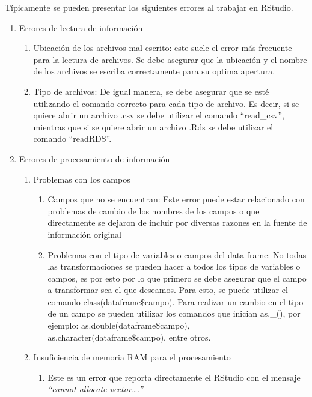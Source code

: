 \documentclass[
]{article}
\begin{document}
Típicamente se pueden presentar los siguientes errores al trabajar en RStudio.

\begin{enumerate}
\def\labelenumi{\arabic{enumi})}
\item
  Errores de lectura de información

  \begin{enumerate}
  \def\labelenumii{\alph{enumii}.}
  \item
    Ubicación de los archivos mal escrito: este suele el error más frecuente para la lectura de archivos. Se debe asegurar que la ubicación y el nombre de los archivos se escriba correctamente para su optima apertura.
  \item
    Tipo de archivos: De igual manera, se debe asegurar que se esté utilizando el comando correcto para cada tipo de archivo. Es decir, si se quiere abrir un archivo .csv se debe utilizar el comando ``read\_csv'', mientras que si se quiere abrir un archivo .Rds se debe utilizar el comando ``readRDS''.
  \end{enumerate}
\item
  Errores de procesamiento de información

  \begin{enumerate}
  \def\labelenumii{\alph{enumii}.}
  \item
    Problemas con los campos

    \begin{enumerate}
    \def\labelenumiii{\roman{enumiii}.}
    \item
      Campos que no se encuentran: Este error puede estar relacionado con problemas de cambio de los nombres de los campos o que directamente se dejaron de incluir por diversas razones en la fuente de información original
    \item
      Problemas con el tipo de variables o campos del data frame: No todas las transformaciones se pueden hacer a todos los tipos de variables o campos, es por esto por lo que primero se debe asegurar que el campo a transformar sea el que deseamos. Para esto, se puede utilizar el comando class(dataframe\$campo). Para realizar un cambio en el tipo de un campo se pueden utilizar los comandos que inician as.\_(), por ejemplo: as.double(dataframe\$campo), as.character(dataframe\$campo), entre otros.
    \end{enumerate}
  \item
    Insuficiencia de memoria RAM para el procesamiento

    \begin{enumerate}
    \def\labelenumiii{\roman{enumiii}.}
    \item
      Este es un error que reporta directamente el RStudio con el mensaje \emph{``cannot allocate vector\ldots.''}


\end{enumerate}
\end{enumerate}
\end{enumerate}
\end{document}

